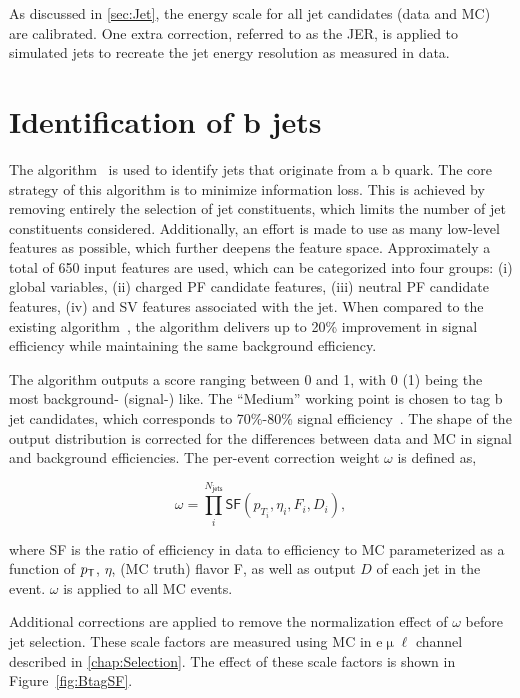 As discussed in \autoref{sec:Jet}, the energy scale for all jet candidates (data and \ac{MC}) are calibrated. One extra correction, referred to as the \ac{JER}, is applied to simulated jets to recreate the jet energy resolution as measured in data. 

\section{Identification of b jets}
\label{sec:Btag}

The \DeepJ algorithm~\cite{Bols:2020bkb} is used to identify jets that originate from a b quark. The core strategy of this algorithm is to minimize information loss. This is achieved by removing entirely the selection of jet constituents, which limits the number of jet constituents considered. Additionally, an effort is made to use as many low-level features as possible, which further deepens the feature space. Approximately a total of 650 input features are used, which can be categorized into four groups: (i) global variables, (ii) charged \ac{PF} candidate features, (iii) neutral \ac{PF} candidate features, (iv) and \ac{SV} features associated with the jet. When compared to the existing \DeepC algorithm~\cite{CMS:2017wtu}, the \DeepJ algorithm delivers up to 20\% improvement in signal efficiency while maintaining the same background efficiency.

The \DeepJ algorithm outputs a score ranging between 0 and 1, with 0 (1) being the most background- (signal-) like. The ``Medium'' working point is chosen to tag b jet candidates, which corresponds to 70\%-80\% signal efficiency~\cite{CMS-DP-2018-058}. The shape of the \DeepJ output distribution is corrected for the differences between data and \ac{MC} in signal and background efficiencies. The per-event correction weight $ \omega$ is defined as,
 
 \begin{equation}
 \omega = \prod_{i}^{N_{\textsf{jets}}} \textsf{SF}(p_{T_{i}},\eta_i, F_i, D_i),
 \end{equation}
 
where \textsf{SF} is the ratio of efficiency in data to efficiency to \ac{MC} parameterized as a function of $p_{\textsf{T}}$, $\eta$, (\ac{MC} truth) flavor F, as well as \DeepJ output $D$ of each jet in the event. $\omega$ is applied to all \ac{MC} events.

Additional corrections are applied to remove the normalization effect of $\omega$ before jet selection. These scale factors are measured using \ac{MC} in e$\upmu\ell$ channel described in \autoref{chap:Selection}. The effect of these scale factors is shown in Figure~\ref{fig:BtagSF}.
 
